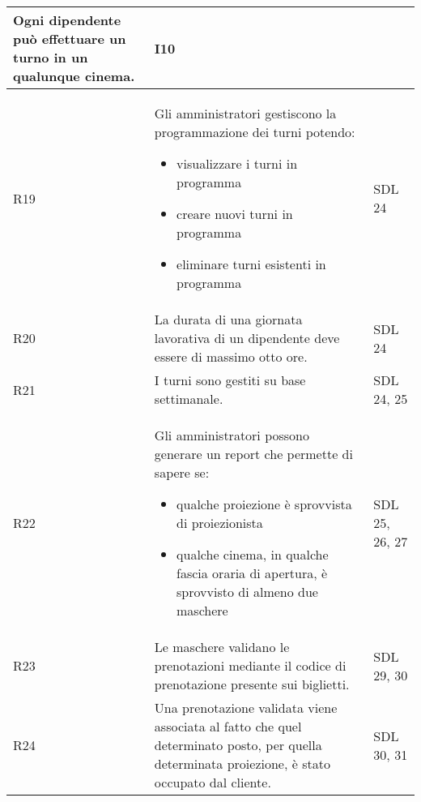 \begin{longtable}{|p{0.8cm}|p{13.4cm}|p{2.1cm}|}
      Ogni dipendente può effettuare un turno in un qualunque cinema.         &
      I10
      \\\hline
      R19                                                                     &
      Gli amministratori gestiscono la programmazione dei turni
      potendo:
      \begin{itemize}
            \item visualizzare i turni in programma
            \item creare nuovi turni in programma
            \item eliminare turni esistenti in programma
      \end{itemize}                           &
      SDL 24
      \\\hline
      R20                                                                     &
      La durata di una giornata lavorativa di un dipendente deve essere di
      massimo otto ore.                                                       &
      SDL 24
      \\\hline
      R21                                                                     &
      I turni sono gestiti su base settimanale.                               &
      SDL 24, 25
      \\\hline
      R22                                                                     &
      Gli amministratori possono generare un report che permette di sapere se:
      \begin{itemize}
            \item qualche proiezione è sprovvista di proiezionista
            \item qualche cinema, in qualche fascia oraria di apertura,
                  è sprovvisto di almeno due maschere
      \end{itemize}             &
      SDL 25, 26, 27
      \\\hline
      R23                                                                     &
      Le maschere validano le prenotazioni mediante il codice di prenotazione
      presente sui biglietti.                                                 &
      SDL 29, 30
      \\\hline
      R24                                                                     &
      Una prenotazione validata viene associata al fatto che quel determinato
      posto, per quella determinata proiezione, è stato occupato dal cliente. &
      SDL 30, 31
      \\\hline

\end{longtable}
